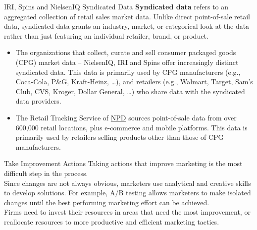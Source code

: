 \documentclass[pdf]{beamer}
\newcommand{\empr}[1]{{\color{franklinblue}\textbf{#1}}}
\theoremstyle{remark}
\theoremstyle{definition}
\begin{document}
\begin{frame}[t]{IRI, Spins and NielsenIQ Syndicated Data}
\empr{Syndicated data} refers to an aggregated collection of retail sales market data. Unlike direct point-of-sale retail data, syndicated data grants an industry, market, or categorical look at the data rather than just featuring an individual retailer, brand, or product. \\
\small
\begin{itemize}
\item The organizations that collect, curate and sell consumer packaged goods (CPG) market data -- NielsenIQ, IRI and Spins offer increasingly distinct syndicated data.  This data is primarily used by CPG manufacturers (e.g., Coca-Cola, P\&G, Kraft-Heinz, \dots), and retailers (e.g., Walmart, Target, Sam's Club, CVS, Kroger, Dollar General, \ldots) who share data with the syndicated data providers. \\
\item 
The Retail Tracking Service of  \href{https://www.npd.com/products/retail-tracking/}{NPD}
sources point-of-sale data from over 600,000 retail locations, plus e-commerce and mobile platforms. This data is primarily used by retailers selling products other than those of CPG manufacturers.
\end{itemize} 
\end{frame}

\begin{frame}[t]{Take Improvement Actions}
Taking actions that improve marketing is the most difficult step in the process. \\
\vspace{1.5ex}
Since changes are not always obvious, marketers use analytical and creative skills to develop solutions. For example, A/B testing allows marketers to make isolated changes until the best performing marketing effort can be achieved. \\
\vspace{1.5ex}
Firms need to invest their resources in areas that need the most improvement, or reallocate resources to more productive and efficient marketing tactics.
\end{frame}
\end{document}
